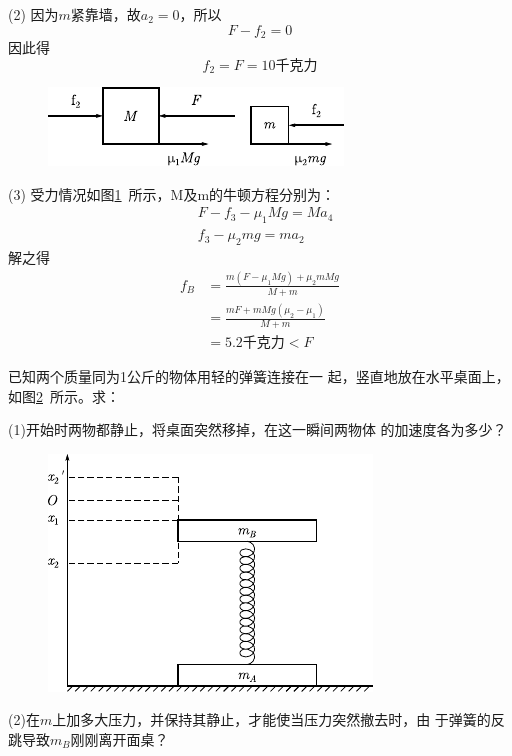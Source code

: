 (2) 因为$ m $紧靠墙，故$ a _ { 2 } = 0 $，所以
\begin{equation*}
 F - f _ { 2 } = 0
\end{equation*}
因此得
\begin{equation*}
 f _ { 2 } = F = 1 0 \text{千克力}
\end{equation*}

\begin{figure}
    \centering
    \includegraphics{figure/fig03.10}
    \caption{}
    \label{fig:03.10}
\end{figure}
(3) 受力情况如图\ref{fig:03.10}~所示，M及m的牛顿方程分别为：
{\setlength{\mathindent}{2em}
\begin{align*}
 &F - f _ { 3 } - \mu _ { 1 } M g = M a _ { 4 } \\
 &f _ { 3 } - \mu _ { 2 } m g = m a _ { 2 }
\end{align*}}
解之得
\begin{align*}
 f _ { B } &= \frac { m \left( F - \mu _ { 1 } M g \right) + \mu _ { 2 } m M g } { M + m } \\
  &= \frac { m F + m M g \left( \mu _ { 2 } - \mu _ { 1 } \right) } { M + m } \\
  &= 5.2 \text{千克力} < F
\end{align*}

\example 已知两个质量同为1公斤的物体用轻的弹簧连接在一
起，竖直地放在水平桌面上，如图\ref{fig:03.11}~所示。求：

(1)开始时两物都静止，将桌面突然移掉，在这一瞬间两物体
的加速度各为多少？

\begin{figure}
    \centering
    \includegraphics{figure/fig03.11}
    \caption{}
    \label{fig:03.11}
\end{figure}
(2)在$ m $上加多大压力，并保持其静止，才能使当压力突然撤去时，由
于弹簧的反跳导致$ m_B $刚刚离开面桌？

